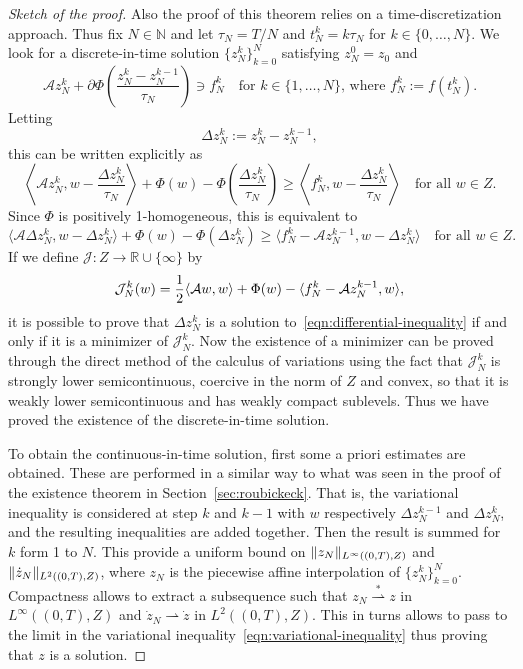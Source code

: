 \documentclass[a4paper,10pt,twoside]{amsbook}
\numberwithin{section}{chapter}
\numberwithin{equation}{chapter}
\theoremstyle{definition}
\DeclarePairedDelimiter{\norm}{\lVert}{\rVert}
\DeclarePairedDelimiter{\dual}{\langle}{\rangle}
\begin{document}
\begin{proof}[Sketch of the proof]
Also the proof of this theorem relies on a time-discretization approach. Thus fix $N\in\mathbb{N}$ and let $\tau_N=T/N$ and $t_N^k=k\tau_N$ for $k\in\{0,\dots,N\}$. We look for a discrete-in-time solution $\{z_N^k\}_{k=0}^N$ satisfying $z_N^0=z_0$ and
\[
\mathcal{A}z_N^k+\partial\Phi\left(\frac{z_N^k-z_N^{k-1}}{\tau_N}\right)\ni f_N^k\quad\text{for $k\in\{1,\dots,N\}$, where $f_N^k:=f(t_N^k)$.}
\]
Letting
\[
\Delta z_N^k:=z_N^k-z_N^{k-1},
\]
this can be written explicitly as
\[
\left\langle\mathcal{A}z_N^k,w-\frac{\Delta z_N^k}{\tau_N}\right\rangle+\Phi(w)-\Phi\left(\frac{\Delta z_N^k}{\tau_N}\right)\ge\left\langle f_N^k,w-\frac{\Delta z_N^k}{\tau_N}\right\rangle\quad\text{for all $w\in Z$}.
\]
Since $\Phi$ is positively 1-homogeneous, this is equivalent to
\begin{equation}
\label{eqn:differential-inequality}
\langle\mathcal{A}\Delta z_N^k,w-\Delta z_N^k\rangle+\Phi(w)-\Phi(\Delta z_N^k)\ge\langle f_N^k-\mathcal{A}z_N^{k-1},w-\Delta z_N^k\rangle\quad\text{for all $w\in Z$}.
\end{equation}
If we define $\mathcal{J}\colon Z\to\mathbb{R}\cup\{\infty\}$ by
\[
\mathcal{J}_N^k(w)=\frac{1}{2}\dual{\mathcal{A}w,w}+\Phi(w)-\dual{f_N^k-\mathcal{A}z_N^{k-1},w},
\]
it is possible to prove that $\Delta z_N^k$ is a solution to~\eqref{eqn:differential-inequality} if and only if it is a minimizer of $\mathcal{J}_N^k$. Now the existence of a minimizer can be proved through the direct method of the calculus of variations using the fact that $\mathcal{J}_N^k$ is strongly lower semicontinuous, coercive in the norm of $Z$ and convex, so that it is weakly lower semicontinuous and has weakly compact sublevels. Thus we have proved the existence of the discrete-in-time solution.

To obtain the continuous-in-time solution, first some a priori estimates are obtained. These are performed in a similar way to what was seen in the proof of the existence theorem in Section~\ref{sec:roubickeck}. That is, the variational inequality is considered at step $k$ and $k-1$ with $w$ respectively $\Delta z_N^{k-1}$ and $\Delta z_N^k$, and the resulting inequalities are added together. Then the result is summed for $k$ form 1 to $N$. This provide a uniform bound on $\norm{z_N}_{L^\infty((0,T),Z)}$ and $\norm{\dot z_N}_{L^2((0,T),Z)}$, where $z_N$ is the piecewise affine interpolation of $\{z_N^k\}_{k=0}^N$. Compactness allows to extract a subsequence such that $z_N\overset{*}{\rightharpoonup}z$ in $L^\infty((0,T),Z)$ and $\dot z_N\rightharpoonup\dot z$ in $L^2((0,T),Z)$. This in turns allows to pass to the limit in the variational inequality~\eqref{eqn:variational-inequality} thus proving that $z$ is a solution.
\end{proof}
\end{document}
